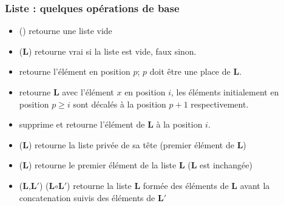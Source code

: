 \begin{frame}
  \frametitle{Liste : quelques opérations de base}
  \begin{itemize}
   \item<1-> () retourne une liste vide
  \item<2->  (\textbf{L}) retourne vrai si la liste est  vide, faux sinon.
  \item<3->  retourne l’élément en position $p$; $p$ doit être une place de $\mathbf{L}$.  
  \item<4->  retourne $\mathbf{L}$ avec l'élément $x$ en position $i$, les éléments initialement en position $p\geq i$ sont décalés à la position $p+1$ respectivement.
   \item<5->  supprime et retourne l'élément de $\mathbf{L}$ à la position $i$. 
 \item<6-> ($\mathbf{L}$) retourne la liste privée de sa tête (premier élément de $\mathbf{L}$)%
\item<7-> ($\mathbf{L}$) retourne le premier élément de la liste $\mathbf{L}$ ($\mathbf{L}$ est inchangée)
\item<8-> ($\mathbf{L}$,$\mathbf{L'}$) ($\mathbf{L} \mathbf{\circ} \mathbf{L'}$) retourne la liste $\mathbf{L}$ formée des éléments de $\mathbf{L}$ avant la concatenation suivis des éléments de $\mathbf{L'}$
  \end{itemize}
\end{frame}


